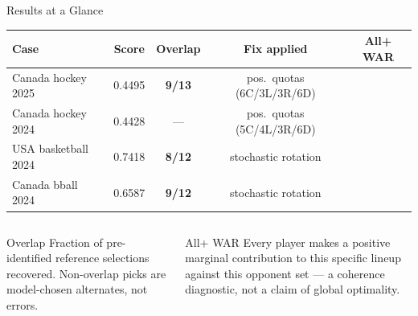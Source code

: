 \documentclass[aspectratio=169,11pt]{beamer}
\newcommand{\good}[1]{\textcolor{bgrn}{\textbf{#1}}}
\begin{document}
\begin{frame}{Results at a Glance}
\begin{center}
\small\begin{tabular}{lcccc}
\toprule
Case & Score & Overlap & Fix applied & All+ WAR \\
\midrule
Canada hockey 2025  & 0.4495 & \good{9/13} & pos.\ quotas (6C/3L/3R/6D) & \good{\checkmark} \\
Canada hockey 2024  & 0.4428 & —           & pos.\ quotas (5C/4L/3R/6D) & \good{\checkmark} \\
USA basketball 2024 & 0.7418 & \good{8/12} & stochastic rotation         & \good{\checkmark} \\
Canada bball 2024   & 0.6587 & \good{9/12} & stochastic rotation         & \good{\checkmark} \\
\bottomrule
\end{tabular}
\end{center}
\vspace{0.5em}
\begin{columns}[T]
\begin{block}{Overlap}
  Fraction of pre-identified reference selections recovered. Non-overlap picks are model-chosen alternates, not errors.
\end{block}
\begin{block}{All+ WAR}
  Every player makes a positive marginal contribution to this specific lineup against this opponent set — a coherence diagnostic, not a claim of global optimality.
\end{block}
\end{columns}
\end{frame}
\end{document}
